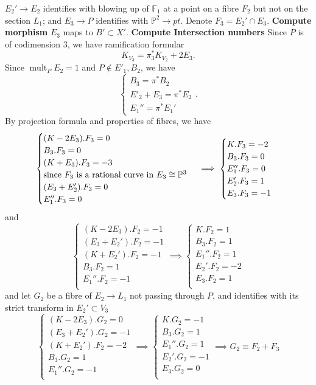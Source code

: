 \documentclass{article}
\begin{document}
$ E_2'\to E_2 $ identifies with blowing up of $ \mathbb{F}_1 $ at a point on a fibre $ F_2 $ but not on the section $ L_1 $; and $ E_3\to P $ identifies with $ \mathbb{P}^2\to pt $. Denote $ F_3=E_2'\cap E_3 $.
\textbf{Compute morphism}
$ E_3 $ maps to $ B'\subset X' $.
\textbf{Compute Intersection numbers}
Since $ P $ is of codimension $ 3 $, we have ramification formular
\[ K_{V_3}=\pi_3^* K_{V_2}+2E_3. \]
Since $ \operatorname{mult}_{P}E_2=1 $ and $ P\notin E'_1, B_2 $, we have
\[\begin{cases}
	B_3=\pi^*B_2\\
	E'_2+E_3=\pi^*E_2\\
	E_1''=\pi^*E_1'
\end{cases}  .\]
By projection formula and properties of fibres, we have
\[ \begin{cases}
	(K-2E_3).F_3=0\\
	B_3.F_3=0\\
	(K+E_3).F_3=-3 \\
	\text{since $ F_3 $ is a rational curve in }E_3\cong \mathbb{P}^3\\
	(E_3+E_2').F_3=0\\
	E_1''.F_3=0
\end{cases} \implies
\begin{cases}
	K.F_3=-2\\
	B_3.F_3=0\\
	E_1''.F_3=0\\
	E_2'.F_3=1\\
	E_3.F_3=-1
\end{cases}\]
and
\[ \begin{cases}
	(K-2E_3).F_2=-1\\
	(E_3+E_2').F_2=-1\\
	(K+E_2').F_2=-1\\
	B_3.F_2=1\\
	E_1''.F_2=-1\\
\end{cases} \implies
\begin{cases}
	K.F_2=1\\
	B_3.F_2=1\\
	E_1''.F_2=1\\
	E_2'.F_2=-2\\
	E_3.F_2=1\\
\end{cases}\]
and let $ G_2 $ be a fibre of $ E_2\to L_1 $ not passing through $ P $, and identifies with its strict transform in $ E_2'\subset V_3 $
\[ \begin{cases}
	(K-2E_3).G_2=0\\
	(E_3+E_2').G_2=-1\\
	(K+E_2').F_2=-2\\
	B_3.G_2=1\\
	E_1''.G_2=-1\\
\end{cases} \implies
\begin{cases}
	K.G_2=-1\\
	B_3.G_2=1\\
	E_1''.G_2=1\\
	E_2'.G_2=-1\\
	E_3.G_2=0\\
\end{cases}
\implies
G_2\equiv F_2+F_3
\]
\end{document}
